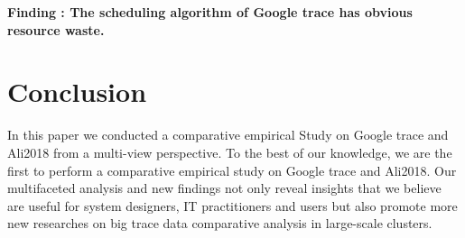 \documentclass[conference]{IEEEtran}
\begin{document}
{\bfseries Finding \theFindingcounter: The scheduling algorithm of Google trace has obvious resource waste.}

\section{Conclusion}\label{sec:Conclusion}
In this paper we conducted a comparative empirical Study on Google trace and Ali2018 from a multi-view perspective.
To the best of our knowledge, we are the first to perform a comparative empirical study on Google trace and Ali2018. Our multifaceted analysis and new findings not only reveal insights that we believe are useful for system designers, IT practitioners and users  but also promote more  new researches  on big trace data comparative analysis in large-scale clusters.

\end{document}

